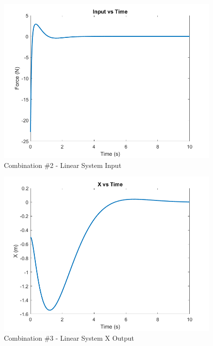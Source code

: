 \begin{figure}[!ht]
    \centering
    \includegraphics[width=\linewidth]{figs/sf_lin_c2_input.png}
    \caption{Combination $\#$2 - Linear System Input}
    \label{}
\end{figure}

\begin{figure}[!ht]
    \centering
    \includegraphics[width=\linewidth]{figs/sf_lin_c3_x.png}
    \caption{Combination $\#$3 - Linear System X Output}
    \label{}
\end{figure}

